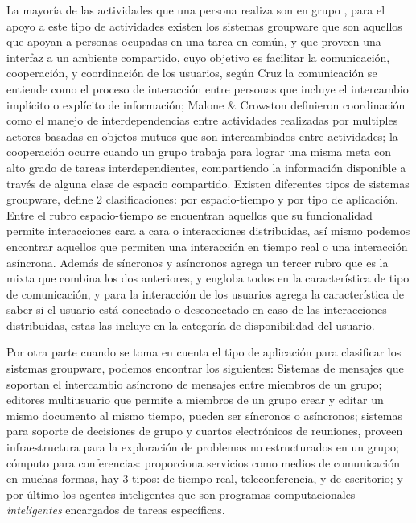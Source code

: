La mayor\'ia de las actividades que una persona realiza son en grupo \cite{ellis1991groupware}, para el apoyo a este tipo de actividades existen los sistemas groupware que son aquellos que apoyan a personas ocupadas en una tarea en com\'un, y que proveen una interfaz a un ambiente compartido, \cite{ellis1991groupware} cuyo objetivo es facilitar la comunicaci\'on, cooperaci\'on, y coordinaci\'on de los usuarios, seg\'un Cruz \cite{cruz2012towards} la comunicaci\'on se entiende como el proceso de interacci\'on entre personas que incluye el intercambio impl\'icito o expl\'icito de informaci\'on; Malone \& Crowston \cite{malone1994interdisciplinary} definieron coordinaci\'on como el manejo de interdependencias entre actividades realizadas por multiples actores basadas en objetos mutuos que son intercambiados entre actividades; la cooperaci\'on ocurre cuando un grupo trabaja para lograr una misma meta \cite{malone1994interdisciplinary} con alto grado de tareas interdependientes, compartiendo la informaci\'on disponible a trav\'es de alguna clase de espacio compartido. Existen diferentes tipos de sistemas groupware, \cite{ellis1991groupware} define 2 clasificaciones: por espacio-tiempo y por tipo de aplicaci\'on. Entre el rubro espacio-tiempo se encuentran aquellos que su funcionalidad permite interacciones cara a cara o interacciones distribuidas, as\'i mismo podemos encontrar aquellos que permiten una interacci\'on en tiempo real o una interacci\'on as\'incrona. Adem\'as de s\'incronos y as\'incronos agrega un tercer rubro que es la mixta que combina los dos anteriores, y engloba todos en la caracter\'istica de tipo de comunicaci\'on, y para la interacci\'on de los usuarios agrega la caracter\'istica de saber si el usuario est\'a conectado o desconectado en caso de las interacciones distribuidas, estas las incluye en la categor\'ia de disponibilidad del usuario\cite{antunes2014reviewing}.

Por otra parte cuando se toma en cuenta el tipo de aplicaci\'on para clasificar los sistemas groupware, podemos encontrar los siguientes: Sistemas de mensajes que soportan el intercambio as\'incrono de mensajes entre miembros de un grupo; editores multiusuario que permite a miembros de un grupo crear y editar un mismo documento al mismo tiempo, pueden ser s\'incronos o as\'incronos; sistemas para soporte de decisiones de grupo y cuartos electr\'onicos de reuniones, proveen infraestructura para la exploraci\'on de problemas no estructurados en un grupo; c\'omputo para conferencias: proporciona servicios como medios de comunicaci\'on en muchas formas, hay 3 tipos: de tiempo real, teleconferencia, y de escritorio; y por \'ultimo los agentes inteligentes que son programas computacionales \textit{inteligentes} encargados de tareas espec\'ificas.

